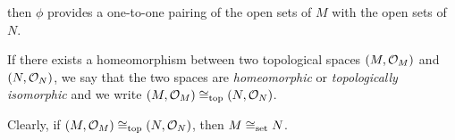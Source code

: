 \bse
{}
\ese

then $\phi$ provides a one-to-one pairing of the open sets of $M$ with the open sets of $N$.

\bd
If there exists a homeomorphism between two topological spaces $(M,\mathcal{O}_M)$ and $(N,\mathcal{O}_N)$, we say that the two spaces are \emph{homeomorphic} or \emph{topologically isomorphic} and we write $(M,\mathcal{O}_M) \cong_\mathrm{top} (N,\mathcal{O}_N)$.
\ed

Clearly, if $(M,\mathcal{O}_M) \cong_\mathrm{top} (N,\mathcal{O}_N)$, then $M \cong_\mathrm{set} N$.




















